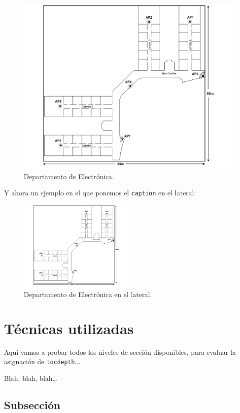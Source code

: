 \documentclass[spanish,openright]{book}
\begin{document}
\begin{figure}[h] \centering
  \includegraphics[width=4.7in]{Figure1}
\caption{Departamento de Electrónica.}
  \label{fig1}
\end{figure}

Y ahora un ejemplo en el que ponemos el \texttt{caption} en el lateral:

\begin{figure}
  \centering
  \includegraphics[width=0.5\textwidth]{Figure1}
  \caption{Departamento de Electrónica en el lateral.}
\end{figure}



\section{Técnicas utilizadas}
\label{sec:tecnicas-utilizadas}

Aquí vamos a probar todos los niveles de sección disponibles, para
evaluar la asignación de \texttt{tocdepth}...

Blah, blah, blah\ldots


\subsection{Subsección}
\label{sec:subseccion}
\end{document}
